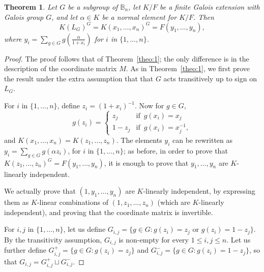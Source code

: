 \documentclass[12pt]{article}
\theoremstyle{plain}
\newtheorem{theorem}{Theorem}
\begin{document}
\begin{theorem}\label{nonamesign}
  Let $G$ be a subgroup of $\mathbb{B}_n$, let $K/F$ be a finite
  Galois extension with Galois group $G$, and let $\alpha \in K$ be a
  normal element for $K/F$. Then
  $$K(L_G)^G = K(x_1,\ldots, x_n)^G = F(y_1, \ldots, y_{n}),$$ 
  where $y_i = \sum_{g \in G} g\left (\frac{\alpha}{1+x_i}\right)$ for $i$ in $\{1, \ldots, n\}$.
\end{theorem}
\begin{proof}
  The proof follows that of Theorem~\ref{theo:1}; the only difference
  is in the description of the coordinate matrix $M$.
  As in Theorem~\ref{theo:1}, we first prove the result under the
  extra assumption that that $G$ acts transitively up to sign on
  $L_G$.


  For $i$ in $\{1,\dots,n\}$, define $z_i = (1+x_i)^{-1} $. Now for $g
  \in G$, $$g(z_i) = \begin{cases} z_j & \text{if} \,\,\, g(x_i) = x_j
    \\ 1-z_j & \text{if} \,\,\, g(x_i) = x_j^{-1},
  \end{cases}$$ 
  and $K(x_1, \ldots , x_n) = K(z_1, \ldots, z_n).$ The elements $y_i$
  can be rewritten as $y_i = \sum_{g \in G} g ({\alpha}z_i)$, for $i$
  in $\{1, \ldots, n\}$; as before, in order to prove that
  $K(z_1,\ldots, z_n)^G = F(y_1, \ldots, y_{n})$, it is enough to
  prove that $y_1,\dots,y_n$ are $K$-linearly independent.

  We actually prove that $(1,y_1,\dots,y_n)$ are $K$-linearly
  independent, by expressing them as $K$-linear combinations of
  $(1,z_1,\dots,z_n)$ (which are $K$-linearly independent), and
  proving that the coordinate matrix is invertible.

  For $i,j$ in $\lbrace 1, \ldots , n \rbrace$, let us define $G_{i,j} =
  \lbrace g \in G : g(z_i) = z_j \,\, \text{or} \,\, g(z_i) = 1-z_j
  \rbrace $. By the transitivity assumption, $G_{i,j}$ is
  non-empty for every $1 \leq i,j \leq n$. Let us further define $G^{+}_{i,j}
  = \lbrace g \in G : g(z_i) = z_j \rbrace$ and $G^{-}_{i,j} =
  \lbrace g \in G : g(z_i) = 1- z_j \rbrace$, so that $G_{i,j}=
  G^{+}_{i,j}\sqcup G^{-}_{i,j}$.  


\end{proof}
\end{document}
